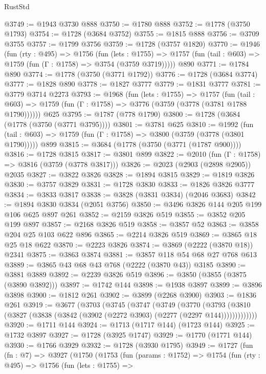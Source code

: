 \begin{lexlean}{RustStd}
\begin{coremodule}
{\begin{coremodule}
{{{{{{{{{{{{{@3749 := @1943 @3730 @888
@3750 := @1780 @888
@3752 := @1778 (@3750 @1793)
@3754 := @1728 (@3684 @3752)
@3755 := @1815 @888
@3756 := @3709 @3755
@3757 := @1799 @3756
@3759 := @1728 (@3757 @1820)
@3770 := @1946
    (fun (rty : @495) =>
    @1756
      (fun (lets : @1755) =>
      @1757 (fun (tail : @603) => @1759 (fun (Γ : @1758) => @3754 (@3759 @3719)))))
    @890
@3771 := @1784 @890
@3774 := @1778 (@3750 (@3771 @1792))
@3776 := @1728 (@3684 @3774)
@3777 := @1828 @890
@3778 := @1827 @3777
@3779 := @1831 @3777
@3781 := @3779 @3714 @2273
@3793 := @1968
    (fun (lets : @1755) =>
    @1757
      (fun (tail : @603) => @1759 (fun (Γ : @1758) => @3776 (@3759 (@3778 (@3781 @1788 @1790))))))
    @625
@3795 := @1787 (@778 @1790)
@3800 := @1728 (@3684 (@1778 (@3750 (@3771 @3795))))
@3801 := @3781 @625
@3810 := @1992
    (fun (tail : @603) => @1759 (fun (Γ : @1758) => @3800 (@3759 (@3778 (@3801 @1790)))))
    @899
@3815 := @3684 (@1778 (@3750 (@3771 (@1787 @900))))
@3816 := @1728 @3815
@3817 := @3801 @899
@3822 := @2010 (fun (Γ : @1758) => @3816 (@3759 (@3778 @3817)))
@3826 := @2023 (@2903 (@2898 @2905)) @2035
@3827 := @3822 @3826
@3828 := @1894 @3815
@3829 := @1819 @3826
@3830 := @3757 @3829
@3831 := @1728 @3830
@3833 := @1826 @3826 @3777
@3834 := @3833 @3817
@3838 := @3828 (@3831 @3834) (@2046 @3683)
@3842 := @1894 @3830 @3834 (@2051 @3756)
@3850 := @3496 @3826 @144 @205 @199 @106 @625 @897 @261
@3852 := @2159 @3826 @519
@3855 := @3852 @205 @199 @897
@3857 := @2168 @3826 @519
@3858 := @3857 @52
@3863 := @3858 @204 @25 @103 @622 @896
@3865 := @2214 @3826 @519
@3869 := @3865 @18 @25 @18 @622
@3870 := @2223 @3826
@3874 := @3869 (@2222 (@3870 @18)) @2341
@3875 := @3863 @3874
@3881 := @3857 @118 @54 @68 @27 @768 @613
@3889 := @3865 @43 @68 @43 @768 (@2222 (@3870 @43)) @3185
@3890 := @3881 @3889
@3892 := @2239 @3826 @519
@3896 := @3850 (@3855 (@3875 (@3890 @3892)))
@3897 := @1742 @144
@3898 := @1938 @3897
@3899 := @3896 @3898
@3900 := @1812 @261
@3902 := @3899 (@2268 @3900)
@3903 := @1836 @261
@3919 := @3677
    (@3703
      (@3745
        (@3747
          (@3749
            (@3770
              (@3793
                (@3810 (@3827 (@3838 (@3842 (@3902 (@2272 @3903) (@2277 (@2297 @144)))))))))))))
@3920 := @1711 @144
@3924 := @1713 (@1717 @144) (@1723 @144)
@3925 := @1732 @3897
@3927 := @1728 (@3925 @1747)
@3929 := @1770 (@1771 @144)
@3930 := @1766 @3929
@3932 := @1728 (@3930 @1795)
@3949 := @1727
    (fun (fn : @7) =>
    @3927
      (@1750
        (@1753
          (fun (params : @1752) =>
          @1754
            (fun (rty : @495) =>
            @1756
              (fun (lets : @1755) =>
}}}}}}}}}}}}}
\end{coremodule}}
\end{coremodule}
\end{lexlean}
